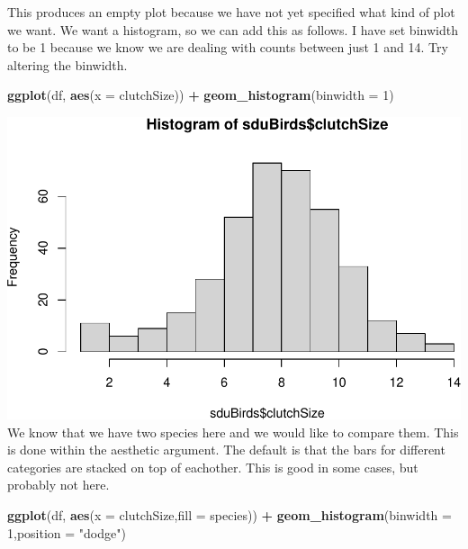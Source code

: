 \documentclass[
  a4paperpaper,
]{book}
\newenvironment{Shaded}{\begin{snugshade}}{\end{snugshade}}
\newcommand{\DataTypeTok}[1]{\textcolor[rgb]{0.13,0.29,0.53}{#1}}
\newcommand{\DecValTok}[1]{\textcolor[rgb]{0.00,0.00,0.81}{#1}}
\newcommand{\KeywordTok}[1]{\textcolor[rgb]{0.13,0.29,0.53}{\textbf{#1}}}
\newcommand{\NormalTok}[1]{#1}
\newcommand{\OperatorTok}[1]{\textcolor[rgb]{0.81,0.36,0.00}{\textbf{#1}}}
\newcommand{\StringTok}[1]{\textcolor[rgb]{0.31,0.60,0.02}{#1}}
\begin{document}
This produces an empty plot because we have not yet specified what kind of plot we want. We want a histogram, so we can add this as follows. I have set binwidth to be 1 because we know we are dealing with counts between just 1 and 14. Try altering the binwidth.

\begin{Shaded}
\begin{Highlighting}[]
\KeywordTok{ggplot}\NormalTok{(df, }\KeywordTok{aes}\NormalTok{(}\DataTypeTok{x =}\NormalTok{ clutchSize)) }\OperatorTok{+}
\StringTok{  }\KeywordTok{geom\_histogram}\NormalTok{(}\DataTypeTok{binwidth =} \DecValTok{1}\NormalTok{)}
\end{Highlighting}
\end{Shaded}

\includegraphics{BB852_files/figure-latex/unnamed-chunk-73-1.pdf}
We know that we have two species here and we would like to compare them. This is done within the aesthetic argument. The default is that the bars for different categories are stacked on top of eachother. This is good in some cases, but probably not here.

\begin{Shaded}
\begin{Highlighting}[]
\KeywordTok{ggplot}\NormalTok{(df, }\KeywordTok{aes}\NormalTok{(}\DataTypeTok{x =}\NormalTok{ clutchSize,}\DataTypeTok{fill =}\NormalTok{ species)) }\OperatorTok{+}
\StringTok{  }\KeywordTok{geom\_histogram}\NormalTok{(}\DataTypeTok{binwidth =} \DecValTok{1}\NormalTok{,}\DataTypeTok{position =} \StringTok{"dodge"}\NormalTok{)}
\end{Highlighting}
\end{Shaded}
\end{document}

